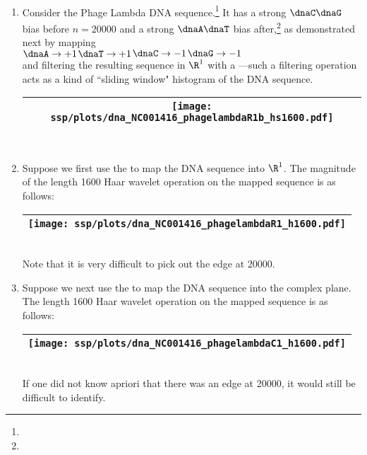 \begin{example}
\label{ex:dnapl}
\mbox{}\\
\begin{enumerate}
  \item \label{item:dnapl_psp}
     Consider the Phage Lambda DNA sequence.\footnote{}
     It has a strong $\dnaC\dnaG$ bias before $n=20000$ and 
            a strong $\dnaA\dnaT$ bias after,\footnote{}
     as demonstrated next by mapping 
     \\\indentx$\dnaA\to+1$\qquad$\dnaT\to+1$\qquad$\dnaC\to-1$\qquad$\dnaG\to-1$\\
     and filtering the resulting sequence in $\R^1$
     with a  ---such
     a filtering operation acts as a kind of ``sliding window" histogram of the DNA sequence.
     \\\begin{tabular}{|>{\scs}c|}
          \hline
          \texttt{[image: ssp/plots/dna\_NC001416\_phagelambdaR1b\_hs1600.pdf]}%
        \\\hline
     \end{tabular}\\
  
  \item \label{item:dnapl_R1pam}
    Suppose we first use the   to map
    the DNA sequence into $\R^1$.
    The magnitude of the length 1600 Haar wavelet operation on the mapped sequence is as follows:
     \\\begin{tabular}{|>{\scs}c|}
          \hline
          \texttt{[image: ssp/plots/dna\_NC001416\_phagelambdaR1\_h1600.pdf]}%
        \\\hline
     \end{tabular}\\
    Note that it is very difficult to pick out the edge at 20000.

  \item \label{item:dnapl_C1qpsk}
    Suppose we next use the   to map
    the DNA sequence into the complex plane.
    The length 1600 Haar wavelet operation on the mapped sequence is as follows:
     \\\begin{tabular}{|>{\scs}c|}
          \hline
          \texttt{[image: ssp/plots/dna\_NC001416\_phagelambdaC1\_h1600.pdf]}%
        \\\hline
     \end{tabular}\\
     If one did not know apriori that there was an edge at 20000, it would still be difficult to identify.
     

\end{enumerate}
\end{example}
